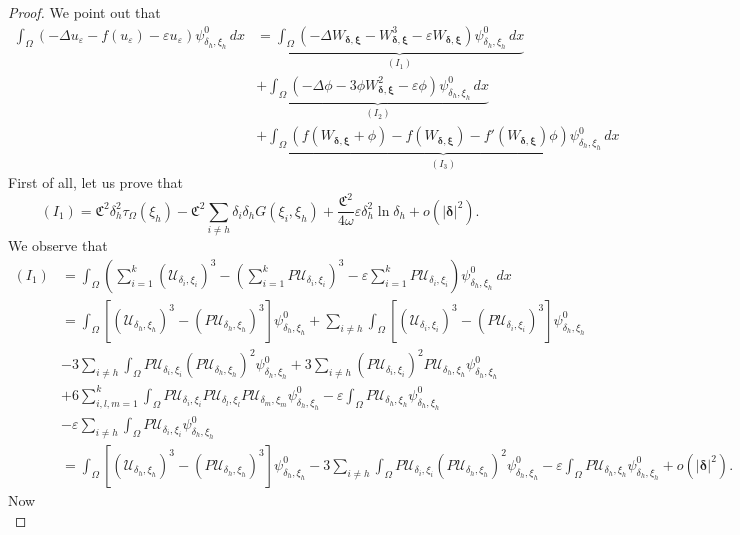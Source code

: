 \documentclass[11pt,a4paper]{amsart}
\newcommand{\e}{\varepsilon}
\renewcommand{\d }{\delta }
\newcommand{\Ui}{{\mathcal{U}_{\delta_i, \xi_i}}}
\newcommand{\Ul}{{\mathcal{U}_{\delta_l, \xi_l}}}
\newcommand{\UM}{{\mathcal{U}_{\delta_m, \xi_m}}}
\newcommand{\Uh}{{\mathcal{U}_{\delta_h, \xi_h}}}
\theoremstyle{definition}
\renewcommand{\(}{\left(}
\renewcommand{\)}{\right)}
\begin{document}
\begin{proof}
We point out that 
\begin{equation*}
\begin{aligned}
\int_{\Omega} \left(-\Delta u_\e -f(u_\e)-\e u_\e\right) \psi^0_{\d_h, \xi_h}\, dx & = \underbrace{\int_{\Omega} (-\Delta W_{\pmb{\d}, \pmb{\xi}} - W_{\pmb{\d}, \pmb{\xi}}^{3} - \e W_{\pmb{\d}, \pmb{\xi}})\psi^0_{\d_h, \xi_h}\, dx}_{(I_1)} \\& + \underbrace{\int_{\Omega} (-\Delta \phi - 3 \phi W_{\pmb{\d}, \pmb{\xi}}^2 - \e \phi) \psi^0_{\d_h, \xi_h}\, dx}_{(I_{2})} \\& + \underbrace{\int_{\Omega} 
\left(f(W_{\pmb{\d}, \pmb{\xi}}+\phi) -f(W_{\pmb{\d}, \pmb{\xi}}) -f'(W_{\pmb{\d}, \pmb{\xi}})\phi \right) \psi^0_{\d_h, \xi_h}\, dx}_{(I_{3})}
\end{aligned}
\end{equation*}
First of all, let us prove that 
\begin{equation}\label{I1}
(I_1)= \mathfrak{C}^{2} \delta_h^2\tau_\Omega(\xi_h)- \mathfrak{C}^{2} \sum_{i\neq h}\d_i\d_h G(\xi_i, \xi_h)+ \frac{\mathfrak{C}^{2}}{4\omega}\e \d_h^2\ln\d_h+o(|\pmb\d|^2).
\end{equation}
We observe that 
\begin{equation*}
\begin{aligned}
(I_1) & = \int_{\Omega} (\sum_{i=1}^{k} (\Ui)^{3} - (\sum_{i=1}^{k} P\Ui)^{3} - \e \sum_{i=1}^{k}P\Ui) \psi^{0}_{\d_h, \xi_h} \ dx 
\\& = \int_{\Omega} \left[ (\Uh)^{3} - (P\Uh)^{3} \right] \psi^{0}_{\d_h, \xi_h} + \sum_{i \neq h} \int_{\Omega} \left[ (\Ui)^{3} - (P\Ui)^{3} \right] \psi^{0}_{\d_h, \xi_h} 
\\& - 3 \sum_{i \neq h} \int_{\Omega} P\Ui (P\Uh)^{2} \psi^{0}_{\d_h, \xi_h}+ 3 \sum_{i \neq h}( P\Ui)^{2} P\Uh \psi^{0}_{\d_h, \xi_h} 
\\& + 6 \sum_{i,l,m=1}^{k} \int_{\Omega} P\Ui P\Ul P\UM \psi^{0}_{\d_h, \xi_h} - \e \int_{\Omega} P\Uh \psi^{0}_{\d_h, \xi_h} \\& - \e \sum_{i \neq h} \int_{\Omega} P\Ui \psi^{0}_{\d_h, \xi_h}
 \\&
= \int_{\Omega} \left[ (\Uh)^{3} - (P\Uh)^{3} \right] \psi^{0}_{\d_h, \xi_h} - 3 \sum_{i \neq h} \int_{\Omega} P\Ui (P\Uh)^{2} \psi^{0}_{\d_h, \xi_h} - \e \int_{\Omega} P\Uh \psi^{0}_{\d_h, \xi_h} + o(|\pmb\d|^2).
\end{aligned}
\end{equation*}
Now 
\begin{equation*}

\end{equation*}
\end{proof}
\end{document}
